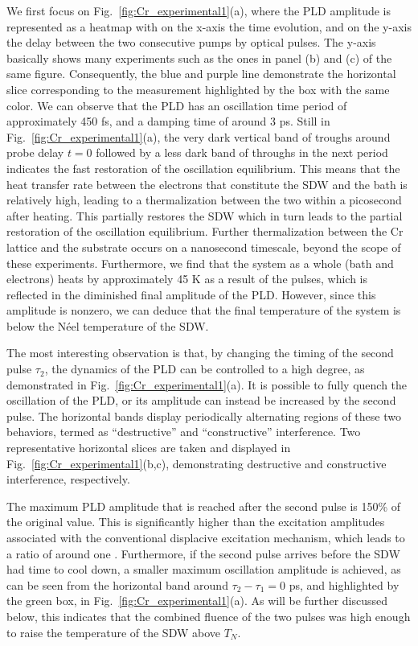 We first focus on Fig.~\ref{fig:Cr_experimental1}(a), where the \gls{PLD} amplitude is represented as a heatmap with on the x-axis the time evolution, and on the y-axis the delay between the two consecutive pumps by optical pulses. The y-axis basically shows many experiments such as the ones in panel (b) and (c) of the same figure. Consequently, the blue and purple line demonstrate the horizontal slice corresponding to the measurement highlighted by the box with the same color.  
We can observe that the \gls{PLD} has an oscillation time period of approximately 450 fs, and a damping time of around 3 ps.
Still in Fig.~\ref{fig:Cr_experimental1}(a), the very dark vertical band of troughs around probe delay $t = 0$ followed by a less dark band of throughs in the next period indicates the fast restoration of the oscillation equilibrium. 
This means that the heat transfer rate between the electrons that constitute the \gls{SDW} and the bath is relatively high, leading to a thermalization between the two within a picosecond after heating.
This partially restores the \gls{SDW} which in turn leads to the partial restoration of the oscillation equilibrium.
Further thermalization between the Cr lattice and the substrate occurs on a nanosecond timescale, beyond the scope of these experiments.
Furthermore, we find that the system as a whole (bath and electrons) heats by approximately 45 K as a result of the pulses, which is reflected in the diminished final amplitude of the \gls{PLD}.
However, since this amplitude is nonzero, we can deduce that the final temperature of the system is below the N\'eel temperature of the \gls{SDW}.

The most interesting observation is that, by changing the timing of the second pulse $\tau_2$, the dynamics of the \gls{PLD} can be controlled to a high degree, as demonstrated in Fig.~\ref{fig:Cr_experimental1}(a).
It is possible to fully quench the oscillation of the \gls{PLD}, or its amplitude can instead be increased by the second pulse.
The horizontal bands display periodically alternating regions of these two behaviors, termed as ``destructive'' and ``constructive'' interference.
Two representative horizontal slices are taken and displayed in Fig.~\ref{fig:Cr_experimental1}(b,c), demonstrating destructive and constructive interference, respectively. 

The maximum \gls{PLD} amplitude that is reached after the second pulse is 150\% of the original value.
This is significantly higher than the excitation amplitudes associated with the conventional displacive excitation mechanism, which leads to a ratio of around one \cite{Singer2015prl,Zeiger1992}. 
Furthermore, if the second pulse arrives before the \gls{SDW} had time to cool down, a smaller maximum oscillation amplitude is achieved, as can be seen from the horizontal band around $\tau_2 - \tau_1 = 0$ ps, and highlighted by the green box, in Fig.~\ref{fig:Cr_experimental1}(a).
As will be further discussed below, this indicates that the combined fluence of the two pulses was high enough to raise the temperature of the \gls{SDW} above $T_N$.

